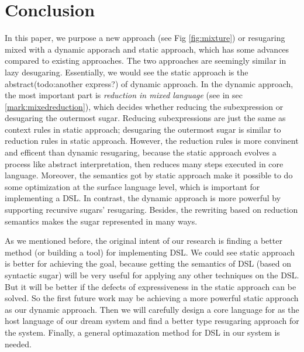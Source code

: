 \section{Conclusion}
\label{sec6}


In this paper, we purpose a new approach (see Fig \ref{fig:mixture}) or resugaring mixed with a dynamic apporach and static approach, which has some advances compared to existing approaches. The two approaches are seemingly similar in lazy desugaring. Essentially, we would see the static approach is the abstract(todo:another express?) of dynamic approach. In the dynamic approach, the most important part is \emph{reduction in mixed language} (see in sec \ref{mark:mixedreduction}), which decides whether reducing the subexpression or desugaring the outermost sugar. Reducing subexpressions are just the same as context rules in static approach; desugaring the outermost sugar is similar to reduction rules in static approach. However, the reduction rules is more convinent and efficent than dynamic resugaring, because the static approach evolves a process like abstract interpretation\cite{AbstractInterpretation}, then reduces many steps executed in core language. Moreover, the semantics got by static approach make it possible to do some optimization at the surface language level, which is important for implementing a DSL. In contrast, the dynamic approach is more powerful by supporting recursive sugars' resugaring. Besides, the rewriting based on reduction semantics makes the sugar represented in many ways.

As we mentioned before, the original intent of our research is finding a better method (or building a tool) for implementing DSL. We could see static approach is better for achieving the goal, because getting the semantics of DSL (based on syntactic sugar) will be very useful for applying any other techniques on the DSL. But it will be better if the defects of expressiveness in the static approach can be solved. So the first future work may be achieving a more powerful static approach as our dynamic approach. Then we will carefully design a core language for as the host language of our dream system and find a better type resugaring approach for the system. Finally, a general optimazation method for DSL in our system is needed.
